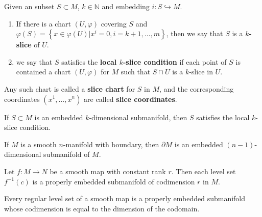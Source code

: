 \documentclass[12pt, oneside]{book}
\begin{document}
\begin{definition}
    Given an subset $S\subset M$, $k\in \mathbb{N}$ and embedding $i:S\hookrightarrow M$.
    \begin{enumerate}
        \item
              If there is a chart $(U,\varphi)$ covering $S$ and $\varphi(S)=\left\{x\in \varphi(U)| x^i=0 ,i=k+1,\ldots,m\right\}$, then we say that $S$ is a \textbf{ $k$-slice} of $U$.
        \item
              we say that $S$ satisfies the \textbf{local $k$-slice condition} if each point of $S$ is contained a chart $(U,\varphi)$ for $M$ such that $S \cap U$ is a $k$-slice
              in $U$.
    \end{enumerate}
    Any such chart is called a \textbf{slice chart} for $S$ in $M$, and the corresponding coordinates $\left(x^1, \ldots, x^n\right)$ are called \textbf{slice coordinates}.
\end{definition}
\begin{theorem}
    If $S\subset M$ is an embedded $k$-dimensional submanifold, then $S$ satisﬁes the local $k$-slice condition.
\end{theorem}
\begin{theorem}
    If $M$ is a smooth $n$-manifold with boundary, then $\partial M$ is an embedded $(n-1)$-dimensional submanifold of $M$.
\end{theorem}

\begin{theorem}
    Let $f:M\to N$ be a smooth map with constant rank $r$. Then each level set $f^{-1}(c)$ is a properly embedded submanifold of codimension $r$ in $M$.
\end{theorem}

\begin{corollary}
    Every regular level set of a smooth map is a properly embedded submanifold whose codimension is equal to the dimension of the codomain.
\end{corollary}
\end{document}

